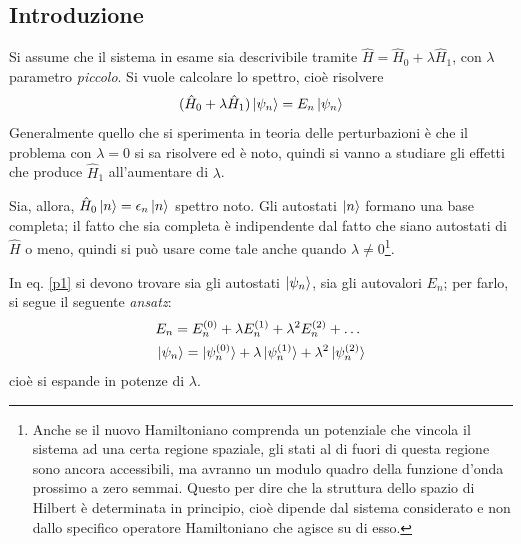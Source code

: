 \documentclass[11pt, a4paper]{scrartcl} %
\numberwithin{equation}{subsection}
\theoremstyle{style2}
\theoremstyle{style1}
\begin{document}
\subsection{Introduzione}

Si assume che il sistema in esame sia descrivibile tramite $\hat{H} = \hat{H}_0 + \lambda \hat{H}_1$, con $\lambda $  parametro \textit{piccolo}.
Si vuole calcolare lo spettro, cio\`e risolvere 
\begin{equation}\label{p1}
	(\hat{H}_0 + \lambda \hat{H}_1 ) \ket{\psi _n} = E_n \ket{\psi _n} 
\end{equation}
Generalmente quello che si sperimenta in teoria delle perturbazioni \`e che il problema con $\lambda = 0$ si sa risolvere ed \`e noto, quindi si vanno a studiare gli effetti che produce $\hat{H}_1$ all'aumentare di $\lambda $.

Sia, allora, $\hat{H}_0 \ket{n} = \epsilon _n \ket{n} $ spettro noto.
Gli autostati $\ket{n} $ formano una base completa; il fatto che sia completa \`e indipendente dal fatto che siano autostati di $\hat{H}$ o meno, quindi si pu\`o usare come tale anche quando $\lambda \neq 0$\footnote{Anche se il nuovo Hamiltoniano comprenda un potenziale che vincola il sistema ad una certa regione spaziale, gli stati al di fuori di questa regione sono ancora accessibili, ma avranno un modulo quadro della funzione d'onda prossimo a zero semmai. Questo per dire che la struttura dello spazio di Hilbert \`e determinata in principio, cio\`e dipende dal sistema considerato e non dallo specifico operatore Hamiltoniano che agisce su di esso.}.

In eq. \ref{p1} si devono trovare sia gli autostati $\ket{\psi _n} $, sia gli autovalori $E_n$; per farlo, si segue il seguente \textit{ansatz}: 
\begin{equation}
	\begin{split}
		&E_n = E_n^{(0)} + \lambda E_n^{(1)} + \lambda ^2 E_n^{(2)} + \ldots\\
		& \ket{\psi _n} = \ket{\psi _n^{(0)} }  + \lambda \ket{\psi ^{(1)} _n} + \lambda ^2 \ket{\psi ^{(2)} _n} 
	\end{split}
\end{equation}
cio\`e si espande in potenze di $\lambda $.
\end{document}
